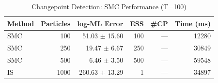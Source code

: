 \begin{table}[t]
\centering
\caption{Changepoint Detection: SMC Performance (T=100)}
\label{tab:changepoint}
\small
\begin{tabular}{lrrrrr}
\toprule
Method & Particles & log-ML Error & ESS & \#CP & Time (ms) \\
\midrule
SMC & 100 & 51.03 $\pm$ 15.60 & 100 & --- & 12280 \\
SMC & 250 & 19.47 $\pm$ 6.67 & 250 & --- & 30849 \\
SMC & 500 & 6.46 $\pm$ 3.50 & 500 & --- & 59548 \\
IS & 1000 & 260.63 $\pm$ 13.29 & 1 & --- & 34897 \\
\bottomrule
\end{tabular}
\end{table}